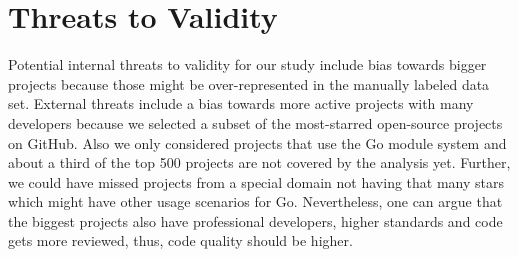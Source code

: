 \section{Threats to Validity}
\label{sec:threatsToValidity}



Potential internal threats to validity for our study include bias towards bigger projects because those might be over-represented in the manually labeled data set. 
External threats include a bias towards more active projects with many developers because we selected a subset of the most-starred open-source projects on GitHub. 
Also we only considered projects that use the Go module system and about a third of the top 500 projects are not covered by the analysis yet.
Further, we could have missed projects from a special domain not having that many stars which might have other usage scenarios for \unsafe{} Go.
Nevertheless, one can argue that the biggest projects also have professional developers, higher standards and code gets more reviewed, thus, code quality should be higher.

